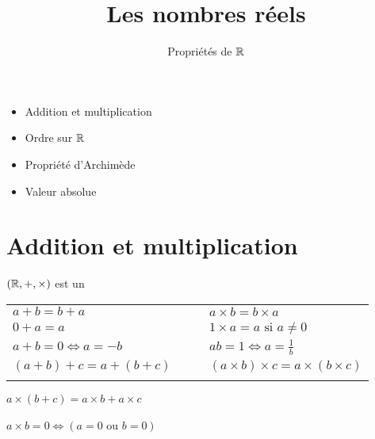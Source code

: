 









\title{{\bf Les nombres réels}}
\subtitle{Propriétés de $\mathbb{R}$}

\begin{frame}
  
  \debutmontitre

  \pause

{\footnotesize
\hfill
{}
\begin{minipage}{0.6\textwidth}
  \begin{itemize}
   \item<3-> Addition et multiplication
   \item<4-> Ordre sur $\mathbb{R}$
   \item<5-> Propriété d'Archimède
   \item<6-> Valeur absolue
  \end{itemize}
\end{minipage}
}

\end{frame}

\setcounter{framenumber}{0}

\section*{Addition et multiplication}

\begin{frame}


\begin{proposition}[$\Rr1$]
$(\mathbb{R},+,\times)$ est un 
\end{proposition}

\pause
\bigskip
\bigskip

\begin{center}
\begin{tabular}{ll}
$a+b=b+a$ & $a\times b=b\times a$ \\
$0+a=a$ & $1\times a =a\text{ si }a\neq 0$ \\
$a+b=0 \iff a=-b$ & $ab=1 \iff a=\frac{1}{b}$\\
$(a+b)+c=a+(b+c)\qquad$  & $(a\times b)\times c=a\times (b\times c)$\\
&\\
\end{tabular}
\end{center}
\pause
\begin{center}
$a\times(b+c)=a\times b+a\times c$ \\
\ \\
$a\times b=0 \iff (a=0 \text{ ou } b=0)$
\end{center}
	
\end{frame}


